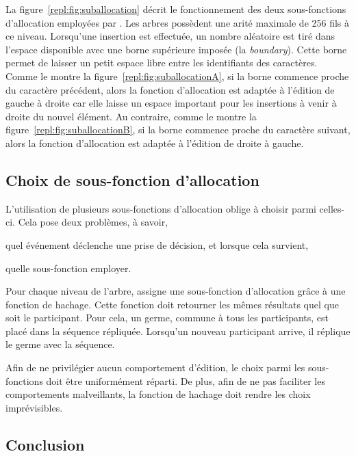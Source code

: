 La figure~\ref{repl:fig:suballocation} décrit le fonctionnement des deux
sous-fonctions d'allocation employées par \LSEQ. Les arbres possèdent une arité
maximale de 256 fils à ce niveau. Lorsqu'une insertion est effectuée, un nombre
aléatoire est tiré dans l'espace disponible avec une borne supérieure imposée
(la \emph{boundary}). Cette borne permet de laisser un petit espace libre entre
les identifiants des caractères.
Comme le montre la figure~\ref{repl:fig:suballocationA}, si la borne commence
proche du caractère précédent, alors la fonction d'allocation est adaptée à
l'édition de gauche à droite car elle laisse un espace important pour les
insertions à venir à droite du nouvel élément. Au contraire, comme le montre la
figure~\ref{repl:fig:suballocationB}, si la borne commence proche du caractère
suivant, alors la fonction d'allocation est adaptée à l'édition de droite à
gauche.

\subsection{Choix de sous-fonction d'allocation}
\label{repl:subsec:allocationchoice}

L'utilisation de plusieurs sous-fonctions d'allocation oblige à choisir parmi
celles-ci. Cela pose deux problèmes, à savoir,
\begin{inparaenum}[(i)]
\item quel événement déclenche une prise de décision, et lorsque cela survient, 
\item quelle sous-fonction employer.
\end{inparaenum}

Pour chaque niveau de l'arbre, \LSEQ assigne une sous-fonction d'allocation
grâce à une fonction de hachage. Cette fonction doit retourner les mêmes
résultats quel que soit le participant. Pour cela, un germe, commune à tous les
participants, est placé dans la séquence répliquée. Lorsqu'un nouveau
participant arrive, il réplique le germe avec la séquence.

Afin de ne privilégier aucun comportement d'édition, le choix parmi les
sous-fonctions doit être uniformément réparti. De plus, afin de ne pas faciliter
les comportements malveillants, la fonction de hachage doit rendre les choix
imprévisibles.

\subsection{Conclusion}

